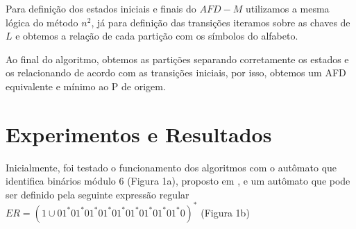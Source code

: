 \documentclass[12pt]{article}
\begin{document}
Para definição dos estados iniciais e finais do $AFD-M$ utilizamos a mesma lógica do método $n^2$, já para definição das transições iteramos sobre as chaves de $L$ e obtemos a relação de cada partição com os símbolos do alfabeto. 

Ao final do algoritmo, obtemos as partições separando corretamente os estados e os relacionando de acordo com as transições iniciais, por isso, obtemos um AFD equivalente e mínimo ao P de origem. 

\section{Experimentos e Resultados}\label{sec:figs}

Inicialmente, foi testado o funcionamento dos algoritmos com o autômato que identifica binários módulo 6 (Figura 1a), proposto em \cite{vieira2006introduccao}, e um autômato que pode ser definido pela seguinte expressão regular $ER = (1 \cup 01^*01^*01^*01^*01^*01^*01^*01^*01^*0)^*$ (Figura 1b)



\begin{figure}[ht]
  \centering
  \\
\end{figure}
\end{document}
